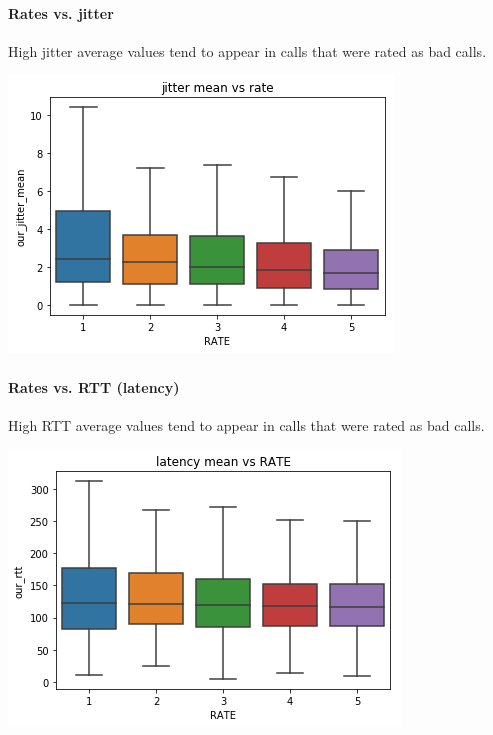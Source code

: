 \paragraph{Rates vs. jitter}\label{rates-vs.-jitter}

High jitter average values tend to appear in calls that were rated as
bad calls.

\begin{center}
\includegraphics{figures/output_25_0.png}
\end{center}
    
\paragraph{Rates vs. RTT (latency)}\label{rates-vs.-rtt-latency}

High RTT average values tend to appear in calls that were rated as bad
calls.

 


\begin{center}
\includegraphics{figures/output_27_0.png}
\end{center}

